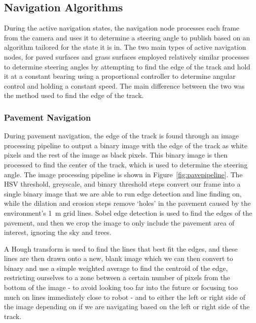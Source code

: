 \documentclass[titlepage, twocolumn]{article}
\begin{document}
            
    \subsection{Navigation Algorithms}

        During the active navigation states, the navigation node processes each frame from the camera and uses it to determine a steering angle to publish based on an algorithm tailored for the state it is in. The two main types of active navigation nodes, for paved surfaces and grass surfaces employed relatively similar processes to determine steering angles by attempting to find the edge of the track and hold it at a constant bearing using a proportional controller to determine angular control and holding a constant speed. The main difference between the two was the method used to find the edge of the track.

        \subsubsection{Pavement Navigation}
            
            During pavement navigation, the edge of the track is found through an image processing pipeline to output a binary image with the edge of the track as white pixels and the rest of the image as black pixels. This binary image is then processed to find the center of the track, which is used to determine the steering angle. The image processing pipeline is shown in Figure~\ref{fig:pavepipeline}. The HSV threshold, greyscale, and binary threshold steps convert our frame into a single binary image that we are able to run edge detection and line finding on, while the dilation and erosion steps remove `holes' in the pavement caused by the environment's 1~m grid lines. Sobel edge detection is used to find the edges of the pavement, and then we crop the image to only include the pavement area of interest, ignoring the sky and trees. 
            
            A Hough transform is used to find the lines that best fit the edges, and these lines are then drawn onto a new, blank image which we can then convert to binary and use a simple weighted average to find the centroid of the edge, restricting ourselves to a zone between a certain number of pixels from the bottom of the image - to avoid looking too far into the future or focusing too much on lines immediately close to robot - and to either the left or right side of the image depending on if we are navigating based on the left or right side of the track. 
\end{document}
